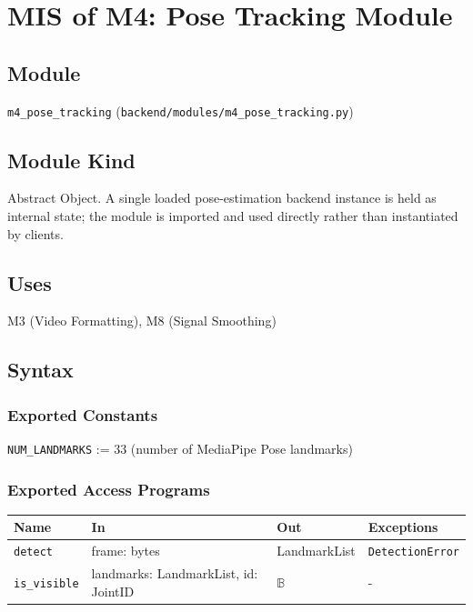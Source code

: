 \documentclass[12pt, titlepage]{article}
\begin{document}
\newpage

\section{MIS of M4: Pose Tracking Module} \label{M4}

\subsection{Module}
\texttt{m4\_pose\_tracking} (\texttt{backend/modules/m4\_pose\_tracking.py})

\subsection{Module Kind}
Abstract Object. A single loaded pose-estimation backend instance is
held as internal state; the module is imported and used directly
rather than instantiated by clients.

\subsection{Uses}
M3 (Video Formatting), M8 (Signal Smoothing)

\subsection{Syntax}

\subsubsection{Exported Constants}
\texttt{NUM\_LANDMARKS} := 33 (number of MediaPipe Pose landmarks)

\subsubsection{Exported Access Programs}

\begin{center}
\begin{tabular}{p{3.5cm} p{4cm} p{3.5cm} p{2cm}}
\hline
\textbf{Name} & \textbf{In} & \textbf{Out} & \textbf{Exceptions} \\
\hline
\texttt{detect} & frame: bytes & LandmarkList & \texttt{DetectionError}\\
\texttt{is\_visible} & landmarks: LandmarkList, id: JointID & $\mathbb{B}$ & - \\
\hline
\end{tabular}
\end{center}
\end{document}
